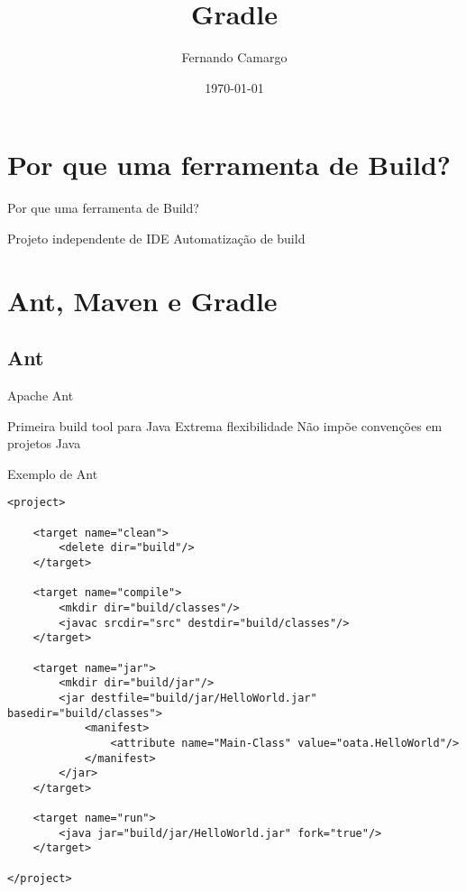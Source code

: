 \documentclass{beamer}
\title{Gradle}
\date{\today}
\author{Fernando Camargo}
\institute{ZG Soluções}
\begin{document}
\maketitle

\section{Por que uma ferramenta de Build?}

\begin{frame}{Por que uma ferramenta de Build?}
 \begin{outline}
    Projeto independente de IDE
    Automatização de build
 \end{outline}
\end{frame}

\section{Ant, Maven e Gradle}

\subsection{Ant}

\begin{frame}{Apache Ant}
 \begin{outline}
    Primeira build tool para Java
    Extrema flexibilidade
    Não impõe convenções em projetos Java
 \end{outline}
\end{frame}

\begin{frame}[fragile]{Exemplo de Ant}
 \begin{verbatim}
<project>

    <target name="clean">
        <delete dir="build"/>
    </target>

    <target name="compile">
        <mkdir dir="build/classes"/>
        <javac srcdir="src" destdir="build/classes"/>
    </target>

    <target name="jar">
        <mkdir dir="build/jar"/>
        <jar destfile="build/jar/HelloWorld.jar" basedir="build/classes">
            <manifest>
                <attribute name="Main-Class" value="oata.HelloWorld"/>
            </manifest>
        </jar>
    </target>

    <target name="run">
        <java jar="build/jar/HelloWorld.jar" fork="true"/>
    </target>

</project>
  \end{verbatim}
\end{frame}
\end{document}
